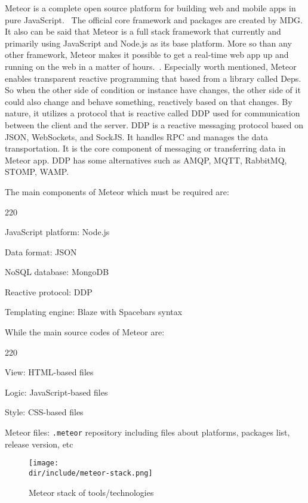 Meteor is a complete open source platform for building web and mobile apps in pure JavaScript.~\autocite{Meteor2015}
The official core framework and packages are created by \ac{MDG}.
It also can be said that Meteor is a full stack framework that currently and primarily using JavaScript and Node.js as its base platform.
More so than any other framework, Meteor makes it possible to get a real-time web app up and running on the web in a matter of hours.~\autocite{Coleman2014Meteor}.
Especially worth mentioned, Meteor enables transparent reactive programming that based from a library called Deps.
So when the other side of condition or instance have changes, the other side of it could also change and behave something, reactively based on that changes.
By nature, it utilizes a protocol that is reactive called \ac{DDP} used for communication between the client and the server.
\ac{DDP} is a reactive messaging protocol based on \ac{JSON}, WebSockets, and SockJS.
It handles \ac{RPC} and manages the data transportation.
It is the core component of messaging or transferring data in Meteor app.
\ac{DDP} has some alternatives such as \ac{AMQP}, \ac{MQTT}, RabbitMQ, \ac{STOMP}, \ac{WAMP}.

The main components of Meteor which must be required are:

\begin{dinglist}{220}
\item JavaScript platform: Node.js
\item Data format: \ac{JSON}
\item NoSQL database: MongoDB
\item Reactive protocol: \ac{DDP}
\item Templating engine: Blaze with Spacebars syntax
\end{dinglist}

While the main source codes of Meteor are:

\begin{dinglist}{220}
\item View: \ac{HTML}-based files
\item Logic: JavaScript-based files
\item Style: \ac{CSS}-based files
\item Meteor files: \verb|.meteor| repository including files about platforms, packages list, release version, etc
\end{dinglist}

\begin{figure}[htbp]
  \centering
  \texttt{[image: \\dir/include/meteor-stack.png]}
  \caption[Meteor Stack]{Meteor stack of tools/technologies}
  \label{fig:meteor-stack}
\end{figure}

